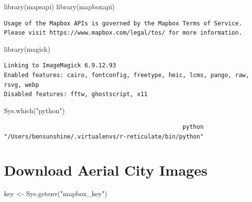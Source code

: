\documentclass[
  letterpaper,
  DIV=11,
  numbers=noendperiod]{scrreprt}
\newenvironment{Shaded}{\begin{snugshade}}{\end{snugshade}}
\newcommand{\FunctionTok}[1]{\textcolor[rgb]{0.28,0.35,0.67}{#1}}
\newcommand{\NormalTok}[1]{\textcolor[rgb]{0.00,0.23,0.31}{#1}}
\newcommand{\OtherTok}[1]{\textcolor[rgb]{0.00,0.23,0.31}{#1}}
\newcommand{\StringTok}[1]{\textcolor[rgb]{0.13,0.47,0.30}{#1}}
\begin{document}
\begin{Shaded}
\begin{Highlighting}[]
\FunctionTok{library}\NormalTok{(mapsapi)}
\FunctionTok{library}\NormalTok{(mapboxapi)}
\end{Highlighting}
\end{Shaded}

\begin{verbatim}
Usage of the Mapbox APIs is governed by the Mapbox Terms of Service.
Please visit https://www.mapbox.com/legal/tos/ for more information.
\end{verbatim}

\begin{Shaded}
\begin{Highlighting}[]
\FunctionTok{library}\NormalTok{(magick)}
\end{Highlighting}
\end{Shaded}

\begin{verbatim}
Linking to ImageMagick 6.9.12.93
Enabled features: cairo, fontconfig, freetype, heic, lcms, pango, raw, rsvg, webp
Disabled features: fftw, ghostscript, x11
\end{verbatim}

\begin{Shaded}
\begin{Highlighting}[]
\FunctionTok{Sys.which}\NormalTok{(}\StringTok{"python"}\NormalTok{)}
\end{Highlighting}
\end{Shaded}

\begin{verbatim}
                                                   python 
"/Users/bensunshine/.virtualenvs/r-reticulate/bin/python" 
\end{verbatim}

\hypertarget{download-aerial-city-images-1}{%
\section{Download Aerial City
Images}\label{download-aerial-city-images-1}}

\begin{Shaded}
\begin{Highlighting}[]
\NormalTok{key }\OtherTok{\textless{}{-}} \FunctionTok{Sys.getenv}\NormalTok{(}\StringTok{"mapbox\_key"}\NormalTok{)}
\end{Highlighting}
\end{Shaded}
\end{document}

